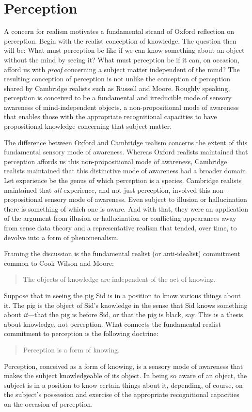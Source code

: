 \section{Perception} %
\label{sec:perception}

A concern for realism motivates a fundamental strand of Oxford reflection on perception. Begin with the realist conception of knowledge.  The question then will be: What must perception be like if we can know something about an object without the mind by seeing it? What must perception be if it can, on occasion, afford us with \emph{proof} concerning a subject matter independent of the mind? The resulting conception of perception is not unlike the conception of perception shared by Cambridge realists such as Russell and Moore. Roughly speaking, perception is conceived to be a fundamental and irreducible mode of sensory awareness of mind-independent objects, a non-propositional mode of awareness that enables those with the appropriate recognitional capacities to have propositional knowledge concerning that subject matter. 

The difference between Oxford and Cambridge realism concerns the extent of this fundamental sensory mode of awareness. Whereas Oxford realists maintained that perception affords us this non-propositional mode of awareness, Cambridge realists maintained that this distinctive mode of awareness had a broader domain. Let experience be the genus of which perception is a species. Cambridge realists maintained that \emph{all} experience, and not just perception, involved this non-propositional sensory mode of awareness. Even subject to illusion or hallucination there is something of which one is aware. And with that, they were an application of the argument from illusion or hallucination or conflicting appearances away from sense data theory and a representative realism that tended, over time, to devolve into a form of phenomenalism.

Framing the discussion is the fundamental realist (or anti-idealist) commitment common to Cook Wilson and Moore:
\begin{quote}
	The objects of knowledge are independent of the act of knowing.
\end{quote}
Suppose that in seeing the pig Sid is in a position to know various things about it. The pig is the object of Sid's knowledge in the sense that Sid knows something about \emph{it}---that the pig is before Sid, or that the pig is black, say. This is a thesis about knowledge, not perception. What connects the fundamental realist commitment to perception is the following doctrine:
\begin{quote}
	Perception is a form of knowing.  
\end{quote}
Perception, conceived as a form of knowing, is a sensory mode of awareness that makes the subject knowledgeable of its object. In being so aware of an object, the subject is in a position to know certain things about it, depending, of course, on the subject's possession and exercise of the appropriate recognitional capacities on the occasion of perception.

